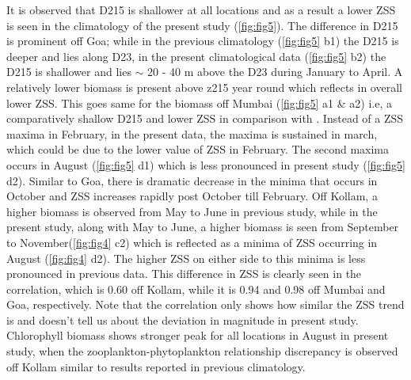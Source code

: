 \documentclass{article}
\begin{document}
	 It is observed that D215 is shallower at all locations and as a result a lower ZSS is seen in the climatology of the present study (\cref{fig:fig5}). The difference in D215 is prominent off Goa; while in the previous climatology (\cref{fig:fig5} b1) the D215 is deeper and lies along D23, in the present climatological data (\cref{fig:fig5} b2) the D215 is shallower and lies $\sim$ 20 - 40 m above the D23 during January to April. A relatively lower biomass is present above z215 year round which reflects in overall lower ZSS. This goes same for the biomass off Mumbai (\cref{fig:fig5} a1 \& a2) i.e, a comparatively shallow D215 and lower ZSS in comparison with \citep{aparna2022seasonal}. Instead of a ZSS maxima in February, in the present data, the maxima is sustained in march, which could be due to the lower value of ZSS in February. The second maxima occurs in August (\cref{fig:fig5} d1) which is less pronounced in present study (\cref{fig:fig5} d2). Similar to Goa, there is dramatic decrease in the minima that occurs in October and ZSS increases rapidly post October till February.  Off Kollam, a higher biomass is observed from May to June in previous study, while in the present study, along with May to June, a higher biomass is seen from September to November(\cref{fig:fig4} c2) which is reflected as a minima of ZSS occurring in August (\cref{fig:fig4} d2). The higher ZSS on either side to this minima is less pronounced in previous data. This difference in ZSS is clearly seen in the correlation, which is 0.60 off Kollam, while it is 0.94 and 0.98 off Mumbai and Goa, respectively. Note that the correlation only shows how similar the ZSS trend is and doesn't tell us about the deviation in magnitude in present study. Chlorophyll biomass shows stronger peak for all locations in August in present study, when the zooplankton-phytoplankton relationship discrepancy is observed off Kollam similar to results reported in previous climatology.
	 
\end{document}
